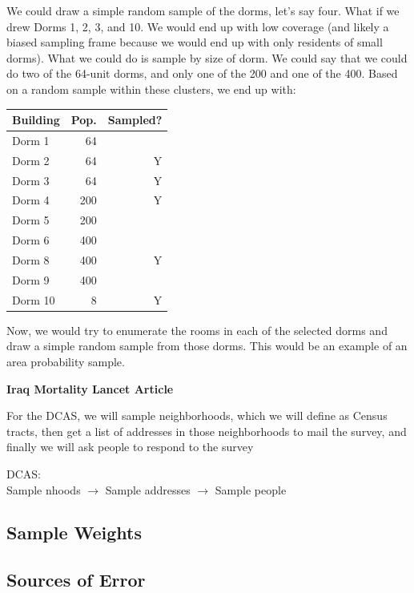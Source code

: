 \documentclass[11pt]{lecturenotes}
\begin{document}
We could draw a simple random sample of the dorms, let's say four. What if we drew Dorms 1, 2, 3, and 10. We would end up with low coverage (and likely a biased sampling frame because we would end up with only residents of small dorms). What we could do is sample by size of dorm. We could say that we could do two of the 64-unit dorms, and only one of the 200 and one of the 400. Based on a random sample within these clusters, we end up with: 

\slide
\begin{tabular}{lrr}
\textbf{Building} & \textbf{Pop.} & \textbf{Sampled?} \\ \toprule
Dorm 1 & 64 & \\
Dorm 2 & 64 & Y\\
Dorm 3 & 64 & Y \\ \midrule
Dorm 4 & 200& Y  \\
Dorm 5 & 200 & \\ \midrule
Dorm 6 & 400 & \\
Dorm 8 & 400 & Y \\
Dorm 9 & 400 & \\ \midrule
Dorm 10 & 8 & Y\\ \bottomrule
\end{tabular}

Now, we would try to enumerate the rooms in each of the selected dorms and draw a simple random sample from those dorms. This would be an example of an area probability sample. 

\textbf{Iraq Mortality Lancet Article}


For the DCAS, we will sample neighborhoods, which we will define as Census tracts, then get a list of addresses in those neighborhoods to mail the survey, and finally we will ask people to respond to the survey
{\centering
DCAS:\\
Sample nhoods $\longrightarrow$ Sample addresses $\longrightarrow$ Sample people

}






\subsection[20]{Sample Weights}


\subsection[10]{Sources of Error}
\end{document}
